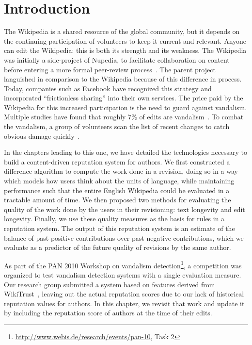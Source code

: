 \section{Introduction}

The Wikipedia is a shared resource of the global community, but it depends on
the continuing participation of volunteers to keep it current and relevant.
Anyone can edit the Wikipedia: this is both its strength and its weakness.
The Wikipedia was initially a side-project of Nupedia, to facilitate collaboration on content
before entering a more formal peer-review process~\cite{wiki:Nupedia}.
The parent project languished in comparison to the Wikipedia because of
this difference in process.  Today, companies such as Facebook have
recognized this strategy and incorporated ``frictionless sharing'' into
their own services.
The price paid by the Wikipedia for this increased participation is the
need to guard against vandalism.
Multiple studies have found that roughly 7\% of edits are
vandalism~\cite{Potthast2008,Potthast2010a}.
To combat the vandalism, a group of volunteers scan the list of recent changes
to catch obvious damage quickly~\cite{wiki:RCPatrol}.

In the chapters leading to this one, we have detailed the technologies
necessary to build a content-driven reputation system for authors.
We first constructed a difference algorithm to compute the work done in a
revision, doing so in a way which models how users think about the units of
language, while maintaining performance such that the entire English Wikipedia
could be evaluated in a tractable amount of time.
We then proposed two methods for evaluating the quality of the work done by the
users in their revisioning: text longevity and edit longevity.
Finally, we use these quality measures as the basis for rules in a reputation
system.
The output of this reputation system is an estimate of the balance of past
positive contributions over past negative contributions, which we evaluate
as a predictor of the future quality of revisions by the same author.

As part of the PAN 2010 Workshop on vandalism
detection\footnote{\url{http://www.webis.de/research/events/pan-10}, Task 2},
a competition was organized to test vandalism detection systems with a
single evaluation measure.
Our research group submitted a system based on features derived from
WikiTrust~\cite{Adler2010b}, leaving out the actual reputation scores due
to our lack of historical reputation values for authors.
In this chapter, we revisit that work and update it by including
the reputation score of authors at the time of their edits.

